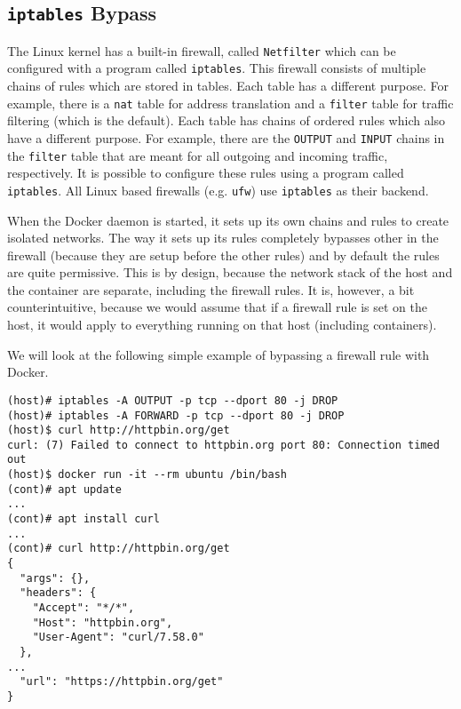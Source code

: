 \subsection{\texorpdfstring{\lstinline{iptables}}{iptables} Bypass}\label{subsection:iptables}
The Linux kernel has a built-in firewall, called \lstinline{Netfilter} which can be configured with a program called \lstinline{iptables}. This firewall consists of multiple chains of rules which are stored in tables. Each table has a different purpose. For example, there is a \lstinline{nat} table for address translation and a \lstinline{filter} table for traffic filtering (which is the default).
Each table has chains of ordered rules which also have a different purpose. For example, there are the \lstinline{OUTPUT} and \lstinline{INPUT} chains in the \lstinline{filter} table that are meant for all outgoing and incoming traffic, respectively.
It is possible to configure these rules using a program called \lstinline{iptables}. All Linux based firewalls (e.g. \lstinline{ufw}) use \lstinline{iptables} as their backend.

\medskip

When the Docker daemon is started, it sets up its own chains and rules to create isolated networks. The way it sets up its rules completely bypasses other in the firewall (because they are setup before the other rules) and by default the rules are quite permissive. This is by design, because the network stack of the host and the container are separate, including the firewall rules. It is, however, a bit counterintuitive, because we would assume that if a firewall rule is set on the host, it would apply to everything running on that host (including containers).

\medskip

We will look at the following simple example of bypassing a firewall rule with Docker.

\begin{lstlisting}[caption={Bypass \lstinline{iptables} firewall rules using Docker.},captionpos=b,label={listing:iptables-bypass}]
(host)# iptables -A OUTPUT -p tcp --dport 80 -j DROP
(host)# iptables -A FORWARD -p tcp --dport 80 -j DROP
(host)$ curl http://httpbin.org/get
curl: (7) Failed to connect to httpbin.org port 80: Connection timed out
(host)$ docker run -it --rm ubuntu /bin/bash
(cont)# apt update
...
(cont)# apt install curl
...
(cont)# curl http://httpbin.org/get
{
  "args": {},
  "headers": {
    "Accept": "*/*",
    "Host": "httpbin.org",
    "User-Agent": "curl/7.58.0"
  },
...
  "url": "https://httpbin.org/get"
}
\end{lstlisting}


